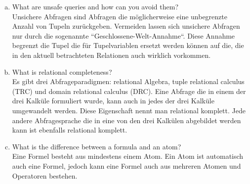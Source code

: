 \documentclass[11pt,a4paper,DIV=9]{scrartcl}
\begin{document}
\begin{enumerate}[a)]
 \item What are unsafe queries and how can you avoid them? \\
 Unsichere Abfragen sind Abfragen die m\"oglicherweise eine unbegrenzte Anzahl von Tupeln zur\"uckgeben. Vermeiden lassen sich unsichere Abfragen nur durch die sogenannte ``Geschlossene-Welt-Annahme``. Diese Annahme begrenzt die Tupel die f\"ur Tupelvariablen ersetzt werden k\"onnen auf die, die in den aktuell betrachteten Relationen auch wirklich vorkommen.
 \item What is relational completeness? \\
 Es gibt drei Abfrageparadigmen: relational Algebra, tuple relational calculus (TRC) und domain relational calculus (DRC). Eine Abfrage die in einem der drei Kalk\"ule formuliert wurde, kann auch in jedes der drei Kalk\"ule umgewandelt werden. Diese Eigenschaft nennt man relational komplett. Jede andere Abfragesprache die in eine von den drei Kalk\"ulen abgebildet werden kann ist ebenfalls relational komplett.
 \item What is the difference between a formula and an atom? \\
 Eine Formel besteht aus mindestens einem Atom. Ein Atom ist automatisch auch eine Formel, jedoch kann eine Formel auch aus mehreren Atomen und Operatoren bestehen.
\end{enumerate}
\end{document}
